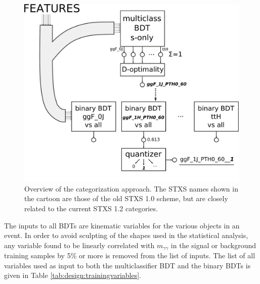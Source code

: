 \begin{figure}[tbp]
  \centering
  \includegraphics[width=0.7\linewidth]{figures/couplings_chapter/sketch_Dopt.pdf}
  \caption{Overview of the categorization approach. The STXS names shown in the cartoon are those of the old STXS 1.0 scheme, but are closely related to the current STXS 1.2 categories.}
  \label{fig:global_cat_sketch}
\end{figure}

The inputs to all BDTs are kinematic variables for the various objects in an event. In order to avoid sculpting of the shapes used in the statistical analysis, any variable found to be linearly correlated with $m_{\gamma \gamma}$ in the signal or background training samples by 5\% or more is removed from the list of inputs. The list of all variables used as input to both the multiclassifier BDT and the binary BDTs is given in Table \ref{tab:design:trainingvariables}.

